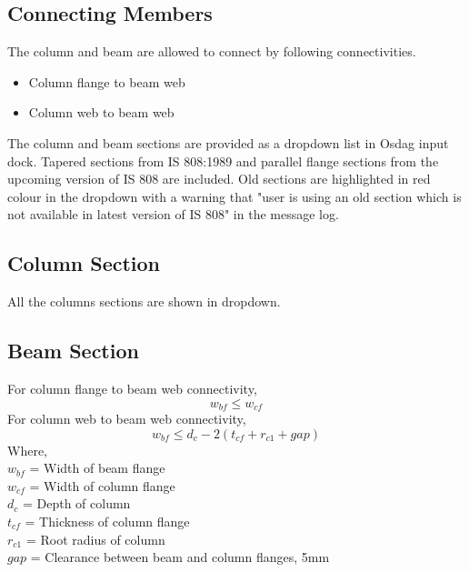 \documentclass[11.5pt,a4paper,oneside]{report}
\begin{document}
\begin{Form}
\chapter{Connecting Members}
%
The column and beam are allowed to connect by following connectivities.
\begin{itemize}
	\item Column flange to beam web
	\item Column web to beam web
\end{itemize}
%
The column and beam sections are provided as a dropdown list in Osdag input dock. Tapered sections from IS 808:1989 and parallel flange sections from the upcoming version of IS 808 are included. Old sections are highlighted in red colour in the dropdown with a warning that "user is using an old section which is not available in latest version of IS 808" in the message log.
%
\section{Column Section}
%
All the columns sections are shown in dropdown.
\section{Beam Section}
%
For column flange to beam web connectivity, 
\begin{equation}
	w_{bf} \le w_{cf}
\end{equation}
%
For column web to beam web connectivity,
\begin{equation}
	w_{bf} \le d_c - 2 (t_{cf} + r_{c1} + gap)
\end{equation}
Where, \\
\indent $w_{bf}$ = Width of beam flange \\
\indent $w_{cf}$ =  Width of column flange \\
\indent $d_c$ = Depth of column \\
\indent $t_{cf}$ = Thickness of column flange \\
\indent $r_{c1}$ = Root radius of column \\
\indent $gap$ = Clearance between beam and column flanges, 5mm



\end{Form}
\end{document}
